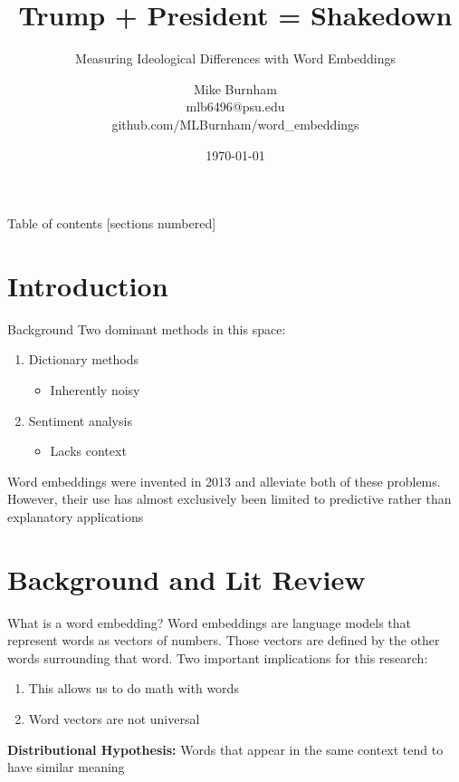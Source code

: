 \documentclass[10pt]{beamer}
\title{Trump + President = Shakedown}
\subtitle{Measuring Ideological Differences with Word Embeddings}
\date{\today}
\author{Mike Burnham \\ mlb6496@psu.edu \\ github.com/MLBurnham/word\_embeddings}
\institute{Penn State University}
\begin{document}
\maketitle

\begin{frame}{Table of contents}
  [sections numbered]
  \tableofcontents[hideallsubsections]
\end{frame}


\section{Introduction}

\begin{frame}[fragile]{Background}
  Two dominant methods in this space:
  \begin{enumerate}
      \item Dictionary methods
        \begin{itemize}
            \item Inherently noisy
        \end{itemize}{}
      \item Sentiment analysis
        \begin{itemize}
            \item Lacks context
        \end{itemize}{}
  \end{enumerate}{}
  \bigskip
  Word embeddings were invented in 2013 and alleviate both of these problems. However, their use has almost exclusively been limited to predictive rather than explanatory applications
\end{frame}


\section{Background and Lit Review}

\begin{frame}{What is a word embedding?}
Word embeddings are language models that represent words as vectors of numbers. Those vectors are defined by the other words surrounding that word. Two important implications for this research:
  \begin{enumerate}
      \item This allows us to do math with words  
      \item Word vectors are not universal
  \end{enumerate}  
  \textbf{Distributional Hypothesis:} Words that appear in the same context tend to have similar meaning
\end{frame}
\end{document}
